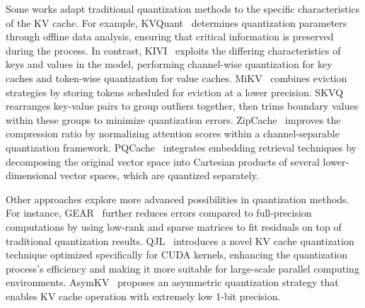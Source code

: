 Some works adapt traditional quantization methods to the specific characteristics of the KV cache. For example, KVQuant~\citep{hooper2024kvquant} determines quantization parameters through offline data analysis, ensuring that critical information is preserved during the process. In contrast, KIVI~\citep{liu2024kivi} exploits the differing characteristics of keys and values in the model, performing channel-wise quantization for key caches and token-wise quantization for value caches. MiKV~\citep{yang2024no} combines eviction strategies by storing tokens scheduled for eviction at a lower precision. SKVQ~\citep{duanmu2024skvq} rearranges key-value pairs to group outliers together, then trims boundary values within these groups to minimize quantization errors. ZipCache~\citep{he2024zipcache} improves the compression ratio by normalizing attention scores within a channel-separable quantization framework. PQCache~\citep{zhang2024pqcache} integrates embedding retrieval techniques by decomposing the original vector space into Cartesian products of several lower-dimensional vector spaces, which are quantized separately.

Other approaches explore more advanced possibilities in quantization methods. For instance, GEAR~\citep{kang2024gear} further reduces errors compared to full-precision computations by using low-rank and sparse matrices to fit residuals on top of traditional quantization results. QJL~\citep{zandieh2024qjl} introduces a novel KV cache quantization technique optimized specifically for CUDA kernels, enhancing the quantization process's efficiency and making it more suitable for large-scale parallel computing environments. AsymKV~\citep{tao2024asymkv} proposes an asymmetric quantization strategy that enables KV cache operation with extremely low 1-bit precision.

